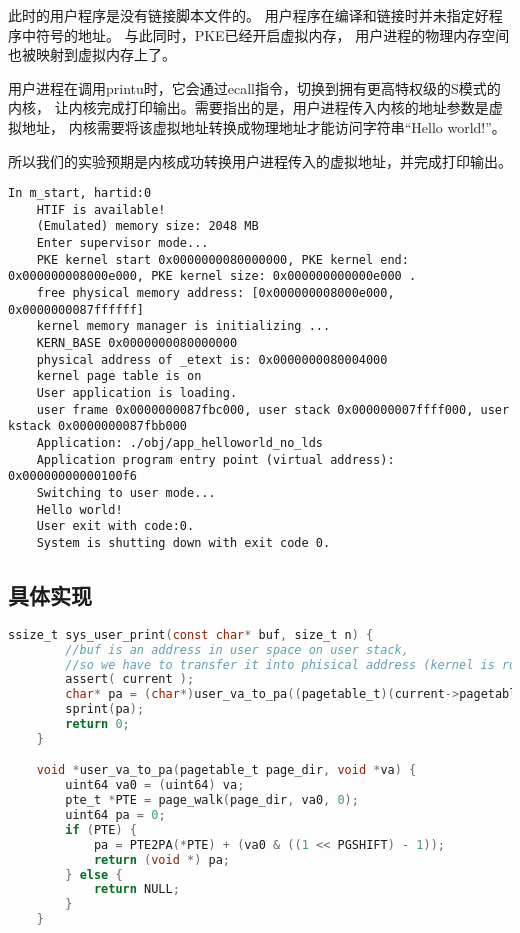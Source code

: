 此时的用户程序是没有链接脚本文件的。
用户程序在编译和链接时并未指定好程序中符号的地址。
与此同时，PKE已经开启虚拟内存，
用户进程的物理内存空间也被映射到虚拟内存上了。

用户进程在调用printu时，它会通过ecall指令，切换到拥有更高特权级的S模式的内核，
让内核完成打印输出。需要指出的是，用户进程传入内核的地址参数是虚拟地址，
内核需要将该虚拟地址转换成物理地址才能访问字符串“Hello world!”。

所以我们的实验预期是内核成功转换用户进程传入的虚拟地址，并完成打印输出。

\begin{lstlisting}[caption={lab4实验结果（移植K210前）}]
    In m_start, hartid:0
    HTIF is available!
    (Emulated) memory size: 2048 MB
    Enter supervisor mode...
    PKE kernel start 0x0000000080000000, PKE kernel end: 0x000000008000e000, PKE kernel size: 0x000000000000e000 .
    free physical memory address: [0x000000008000e000, 0x0000000087ffffff]
    kernel memory manager is initializing ...
    KERN_BASE 0x0000000080000000
    physical address of _etext is: 0x0000000080004000
    kernel page table is on
    User application is loading.
    user frame 0x0000000087fbc000, user stack 0x000000007ffff000, user kstack 0x0000000087fbb000
    Application: ./obj/app_helloworld_no_lds
    Application program entry point (virtual address): 0x00000000000100f6
    Switching to user mode...
    Hello world!
    User exit with code:0.
    System is shutting down with exit code 0.    
\end{lstlisting}

\subsection{具体实现}

\begin{lstlisting}[caption={虚拟地址到物理地址的转换}, label={lst:app_virt_to_phys}, language=C]
    ssize_t sys_user_print(const char* buf, size_t n) {
        //buf is an address in user space on user stack,
        //so we have to transfer it into phisical address (kernel is running in direct mapping).
        assert( current );
        char* pa = (char*)user_va_to_pa((pagetable_t)(current->pagetable), (void*)buf);
        sprint(pa);
        return 0;
    }    

    void *user_va_to_pa(pagetable_t page_dir, void *va) {
        uint64 va0 = (uint64) va;
        pte_t *PTE = page_walk(page_dir, va0, 0);
        uint64 pa = 0;
        if (PTE) {
            pa = PTE2PA(*PTE) + (va0 & ((1 << PGSHIFT) - 1));
            return (void *) pa;
        } else {
            return NULL;
        }
    }    
\end{lstlisting}

